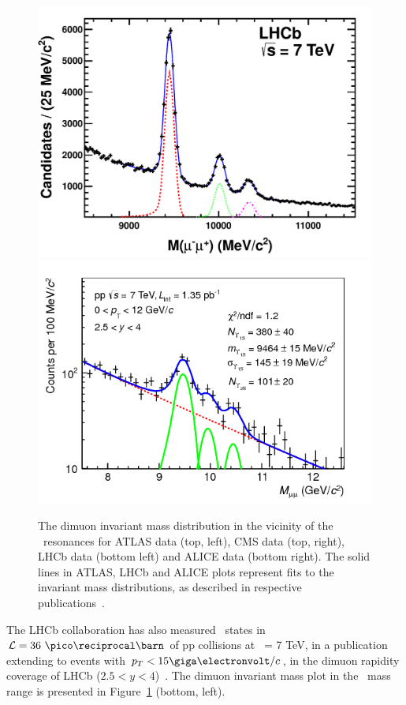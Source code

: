 \begin{figure}[h]
\begin{center}
  \includegraphics[height=0.21\textheight]{Chapters/pQuarkonia/lhcbUpsi.pdf}
  \includegraphics[height=0.21\textheight]{Chapters/pQuarkonia/AliceUpsi.png}
  \caption{The dimuon invariant mass distribution in the vicinity of
    the \PgU\ resonances for ATLAS data (top, left), CMS data (top,
    right), LHCb data (bottom left) and ALICE data (bottom right). The
    solid lines in ATLAS, LHCb and ALICE plots represent fits to the invariant mass distributions, as
  described in respective publications~\cite{atlasUpsilon7tev,lhcbUpsi1,aliceUpsi_pp}.}
  \label{fig:upsimass_pp}
\end{center}
\end{figure}


The LHCb collaboration has also measured \PgU~states in $\lumi = 36~\invpb$
of pp collisions at \s\ = 7 TeV, in a publication extending to events with $\pt < 15
\GeVc$, in the dimuon rapidity coverage of LHCb ($2.5 < y <
4$)~\cite{lhcbUpsi1}. The dimuon invariant mass plot in the \PgU~mass
range is presented in Figure~\ref{fig:upsimass_pp} (bottom, left).


